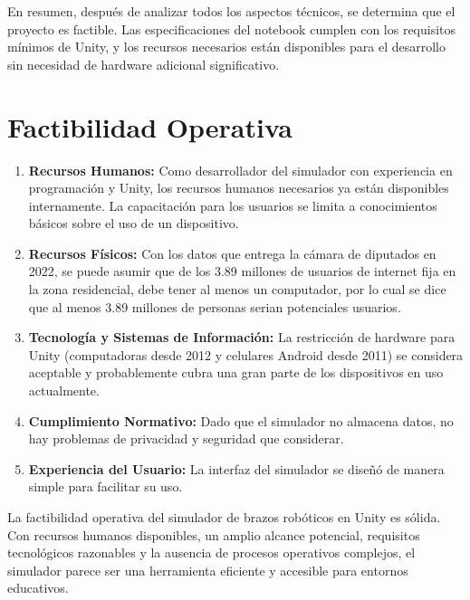 En resumen, después de analizar todos los aspectos técnicos, se determina que el proyecto es factible. Las especificaciones del notebook cumplen con los requisitos mínimos de Unity, y los recursos necesarios están disponibles para el desarrollo sin necesidad de hardware adicional significativo.

\clearpage

\section{Factibilidad Operativa}

\begin{enumerate}
    \item \textbf{Recursos Humanos:}
    Como desarrollador del simulador con experiencia en programación y Unity, los recursos humanos necesarios ya están disponibles internamente. La capacitación para los usuarios se limita a conocimientos básicos sobre el uso de un dispositivo.

    \item \textbf{Recursos Físicos:}
    Con los datos que entrega la cámara de diputados en 2022\cite{InformeCamara}, se puede asumir que de los 3.89 millones de usuarios de internet fija en la zona residencial, debe tener al menos un computador, por lo cual se dice que al menos 3.89 millones de personas serian potenciales usuarios.

    \item \textbf{Tecnología y Sistemas de Información:}
    La restricción de hardware para Unity (computadoras desde 2012 y celulares Android desde 2011) se considera aceptable y probablemente cubra una gran parte de los dispositivos en uso actualmente.

    \item \textbf{Cumplimiento Normativo:}
    Dado que el simulador no almacena datos, no hay problemas de privacidad y seguridad que considerar.

    \item \textbf{Experiencia del Usuario:}
    La interfaz del simulador se diseñó de manera simple para facilitar su uso.

\end{enumerate}

La factibilidad operativa del simulador de brazos robóticos en Unity es sólida. Con recursos humanos disponibles, un amplio alcance potencial, requisitos tecnológicos razonables y la ausencia de procesos operativos complejos, el simulador parece ser una herramienta eficiente y accesible para entornos educativos.


